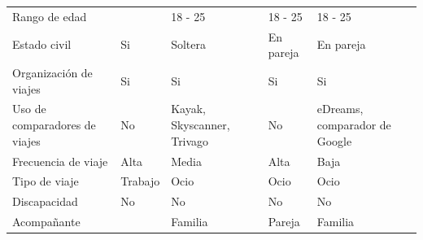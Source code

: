 \begin{table}[H]
    \centering
    \begin{tabular}{|p{10em}|p{7em}|p{7em}|p{7em}|p{8em}|}
        \cline{2-5}
        \cellcolor{black}                 & \cellcolor{black}{\textcolor{white}{Madi}}  & \cellcolor{black}{\textcolor{white}{Sofía}}   & \cellcolor{black}{\textcolor{white}{Alberto}} & \cellcolor{black}{\textcolor{white}{Beatriz}} \\ \hline
        Rango de edad                     &                                             & 18 - 25                                       & 18 - 25                                       & 18 - 25                                       \\ \hline
        Estado civil                      & Si                                          & Soltera                                       & En pareja                                     & En pareja                                     \\ \hline
        Organización de viajes            & Si                                          & Si                                            & Si                                            & Si                                            \\ \hline
        Uso de comparadores de viajes     & No                                          & Kayak, Skyscanner, Trivago                    & No                                            & eDreams, comparador de Google                 \\ \hline
        Frecuencia de viaje               & Alta                                        & Media                                         & Alta                                          & Baja                                          \\ \hline
        Tipo de viaje                     & Trabajo                                     & Ocio                                          & Ocio                                          & Ocio                                          \\ \hline
        Discapacidad                      & No                                          & No                                            & No                                            & No                                            \\ \hline
        Acompañante                       &                                             & Familia                                       & Pareja                                        & Familia                                       \\ \hline

\end{tabular}
\end{table}
